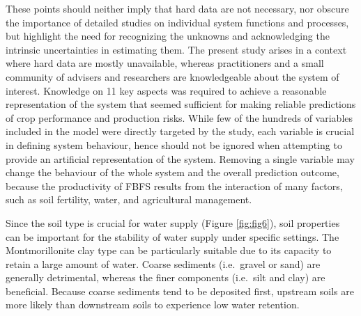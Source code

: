 \documentclass[]{elsarticle} %
\begin{document}
These points should neither imply that hard data are not necessary, nor obscure the importance of detailed studies on individual system functions and processes, but highlight the need for recognizing the unknowns and acknowledging the intrinsic uncertainties in estimating them. The present study arises in a context where hard data are mostly unavailable, whereas practitioners and a small community of advisers and researchers are knowledgeable about the system of interest. Knowledge on 11 key aspects was required to achieve a reasonable representation of the system that seemed sufficient for making reliable predictions of crop performance and production risks. While few of the hundreds of variables included in the model were directly targeted by the study, each variable is crucial in defining system behaviour, hence should not be ignored when attempting to provide an artificial representation of the system. Removing a single variable may change the behaviour of the whole system and the overall prediction outcome, because the productivity of FBFS results from the interaction of many factors, such as soil fertility, water, and agricultural management.

Since the soil type is crucial for water supply (Figure \ref{fig:fig6}), soil properties can be important for the stability of water supply under specific settings. The Montmorillonite clay type can be particularly suitable due to its capacity to retain a large amount of water. Coarse sediments (i.e.~gravel or sand) are generally detrimental, whereas the finer components (i.e.~silt and clay) are beneficial. Because coarse sediments tend to be deposited first, upstream soils are more likely than downstream soils to experience low water retention.
\end{document}
